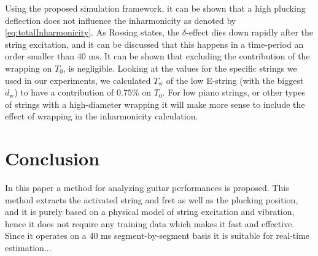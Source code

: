 \documentclass{article}
\begin{document}
\begin{sloppy}
Using the proposed simulation framework, it can be shown that a high plucking deflection does not influence the inharmonicity as denoted by \eqref{eq:totalInharmonicity}. As Rossing states, the $\delta$-effect dies down rapidly after the string excitation, and it can be discussed that this happens in a time-period an order smaller than 40 ms. It can be shown that excluding the contribution of the wrapping on $T_0$, is negligible. Looking at the values for the specific strings we used in our experiments, we calculated $T_\text{w}$ of the low E-string (with the biggest $d_\text{w}$) to have a contribution of $0.75\%$ on $T_0$. For low piano strings, or other types of strings with a high-diameter wrapping it will make more sense to include the effect of wrapping in the inharmonicity calculation.
\vspace{-2}
\section{Conclusion}
In this paper a method for analyzing guitar performances is proposed. This method extracts the activated string and fret as well as the plucking position, and it is purely based on a physical model of string excitation and vibration, hence it does not require any training data which makes it fast and effective. Since it operates on a 40 ms segment-by-segment basis it is suitable for real-time estimation...
%

\pagebreak


\end{sloppy}
\end{document}
